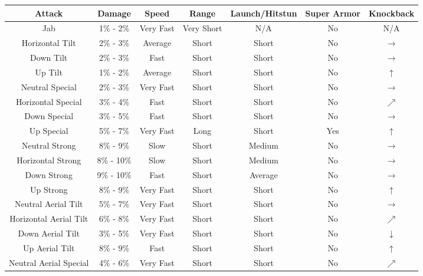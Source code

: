 \begin{table}[h!]
    \centering
    \begin{tabular}{| c | c | c | c | c | c | c |}
        \hline
        \textbf{Attack} & \textbf{Damage} & \textbf{Speed} & \textbf{Range} & \textbf{Launch/Hitstun} & \textbf{Super Armor} & \textbf{Knockback} \\
        \hline
        Jab & 1\% - 2\% & Very Fast & Very Short & N/A & No & N/A \\
        \hline
        Horizontal Tilt & 2\% - 3\% & Average & Short & Short & No & $\rightarrow$ \\
        \hline
        Down Tilt & 2\% - 3\% & Fast & Short & Short & No & $\rightarrow$ \\
        \hline
        Up Tilt & 1\% - 2\% & Average & Short & Short & No & $\uparrow$ \\
        \hline
        Neutral Special & 2\% - 3\% & Very Fast & Short & Short & No & $\rightarrow$ \\
        \hline
        Horizontal Special & 3\% - 4\% & Fast & Short & Short & No & $\nearrow$ \\
        \hline
        Down Special & 3\% - 5\% & Fast & Short & Short & No & $\rightarrow$ \\
        \hline
        Up Special & 5\% - 7\% & Very Fast & Long & Short & Yes & $\uparrow$ \\
        \hline
        Neutral Strong & 8\% - 9\% & Slow & Short & Medium & No & $\rightarrow$ \\
        \hline
        Horizontal Strong & 8\% - 10\% & Slow & Short & Medium & No & $\rightarrow$ \\
        \hline
        Down Strong & 9\% - 10\% & Fast & Short & Average & No & $\rightarrow$ \\
        \hline
        Up Strong & 8\% - 9\% & Very Fast & Short & Short & No & $\uparrow$ \\
        \hline
        Neutral Aerial Tilt & 5\% - 7\% & Very Fast & Short & Short & No & $\rightarrow$ \\
        \hline
        Horizontal Aerial Tilt & 6\% - 8\% & Very Fast & Short & Short & No & $\nearrow$ \\
        \hline
        Down Aerial Tilt & 3\% - 5\% & Very Fast & Short & Short & No & $\downarrow$ \\
        \hline
        Up Aerial Tilt & 8\% - 9\% & Fast & Short & Short & No & $\uparrow$ \\
        \hline
        Neutral Aerial Special & 4\% - 6\% & Very Fast & Short & Short & No & $\nearrow$ \\

\end{tabular}
\end{table}
